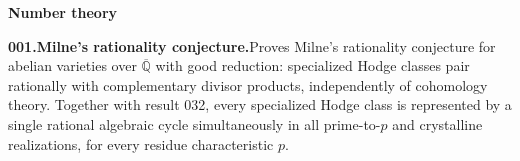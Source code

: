 \documentclass[11pt,a4paper]{article}
\begin{document}
 


  \par{}\addvspace{12pt}
  \hypertarget{subject 1}{}\label{subject 1}
  {\fontsize{15}{18}\selectfont\bfseries Number theory\par}
  \nobreak\vspace{9pt}\nobreak



  \par \begin{minipage}{\linewidth}
  \fontsize{10.5}{12.6}\selectfont\RaggedRight
  \hypertarget{result 001}{}
  {\bfseries\textcolor{muted}{001.}\enspace Milne's rationality conjecture.}\enspace Proves Milne's rationality conjecture for abelian varieties over $\overline{\mathbb Q}$ with good reduction: specialized Hodge classes pair rationally with complementary divisor products, independently of cohomology theory. Together with result 032, every specialized Hodge class is represented by a single rational algebraic cycle simultaneously in all prime-to-$p$ and crystalline realizations, for every residue characteristic $p$.\par
  \end{minipage}\par\vspace{5pt}
\end{document}
